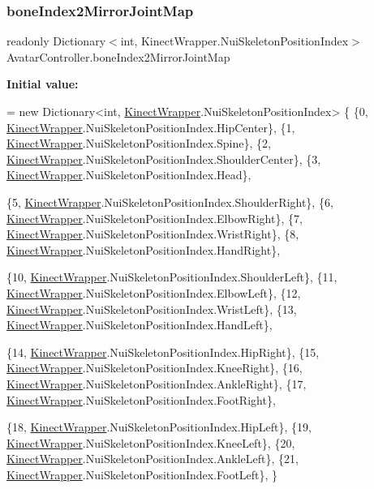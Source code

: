 \subsubsection{\texorpdfstring{bone\+Index2\+Mirror\+Joint\+Map}{boneIndex2MirrorJointMap}}
{\footnotesize\ttfamily readonly Dictionary$<$int, Kinect\+Wrapper.\+Nui\+Skeleton\+Position\+Index$>$ Avatar\+Controller.\+bone\+Index2\+Mirror\+Joint\+Map\hspace{0.3cm}{\ttfamily [protected]}}

{\bfseries Initial value\+:}
\begin{DoxyCode}
= \textcolor{keyword}{new} Dictionary<int, \mbox{\hyperlink{class_kinect_wrapper}{KinectWrapper}}.NuiSkeletonPositionIndex>
    \{
        \{0, \mbox{\hyperlink{class_kinect_wrapper}{KinectWrapper}}.NuiSkeletonPositionIndex.HipCenter\},
        \{1, \mbox{\hyperlink{class_kinect_wrapper}{KinectWrapper}}.NuiSkeletonPositionIndex.Spine\},
        \{2, \mbox{\hyperlink{class_kinect_wrapper}{KinectWrapper}}.NuiSkeletonPositionIndex.ShoulderCenter\},
        \{3, \mbox{\hyperlink{class_kinect_wrapper}{KinectWrapper}}.NuiSkeletonPositionIndex.Head\},
        
        \{5, \mbox{\hyperlink{class_kinect_wrapper}{KinectWrapper}}.NuiSkeletonPositionIndex.ShoulderRight\},
        \{6, \mbox{\hyperlink{class_kinect_wrapper}{KinectWrapper}}.NuiSkeletonPositionIndex.ElbowRight\},
        \{7, \mbox{\hyperlink{class_kinect_wrapper}{KinectWrapper}}.NuiSkeletonPositionIndex.WristRight\},
        \{8, \mbox{\hyperlink{class_kinect_wrapper}{KinectWrapper}}.NuiSkeletonPositionIndex.HandRight\},
        
        \{10, \mbox{\hyperlink{class_kinect_wrapper}{KinectWrapper}}.NuiSkeletonPositionIndex.ShoulderLeft\},
        \{11, \mbox{\hyperlink{class_kinect_wrapper}{KinectWrapper}}.NuiSkeletonPositionIndex.ElbowLeft\},
        \{12, \mbox{\hyperlink{class_kinect_wrapper}{KinectWrapper}}.NuiSkeletonPositionIndex.WristLeft\},
        \{13, \mbox{\hyperlink{class_kinect_wrapper}{KinectWrapper}}.NuiSkeletonPositionIndex.HandLeft\},
        
        \{14, \mbox{\hyperlink{class_kinect_wrapper}{KinectWrapper}}.NuiSkeletonPositionIndex.HipRight\},
        \{15, \mbox{\hyperlink{class_kinect_wrapper}{KinectWrapper}}.NuiSkeletonPositionIndex.KneeRight\},
        \{16, \mbox{\hyperlink{class_kinect_wrapper}{KinectWrapper}}.NuiSkeletonPositionIndex.AnkleRight\},
        \{17, \mbox{\hyperlink{class_kinect_wrapper}{KinectWrapper}}.NuiSkeletonPositionIndex.FootRight\},
        
        \{18, \mbox{\hyperlink{class_kinect_wrapper}{KinectWrapper}}.NuiSkeletonPositionIndex.HipLeft\},
        \{19, \mbox{\hyperlink{class_kinect_wrapper}{KinectWrapper}}.NuiSkeletonPositionIndex.KneeLeft\},
        \{20, \mbox{\hyperlink{class_kinect_wrapper}{KinectWrapper}}.NuiSkeletonPositionIndex.AnkleLeft\},
        \{21, \mbox{\hyperlink{class_kinect_wrapper}{KinectWrapper}}.NuiSkeletonPositionIndex.FootLeft\},
    \}
\end{DoxyCode}
